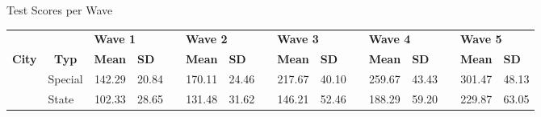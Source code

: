 \documentclass{beamer}
\begin{document}
\begin{frame}[label=ScoresWave]{Test Scores per Wave}
\vspace{-67pt} \flushright \hyperlink{Mirror}{\beamerbutton{\textcolor{red}{Mirror}}}
\vspace{30pt}
\begin{table}[H]
\label{table:AverageGrade}                        
  \begin{adjustbox}{width=1\textwidth}
    \begin{tabular}{llllllllllllllll}
    \toprule
          &       & \multicolumn{2}{p{6.055em}}{\textbf{\hspace{12pt} Wave 1 }} &       & \multicolumn{2}{p{6.055em}}{\textbf{\hspace{12pt} Wave 2 }} &       & \multicolumn{2}{p{6.055em}}{\textbf{\hspace{12pt} Wave 3 }} &       & \multicolumn{2}{p{6.055em}}{\textbf{\hspace{12pt} Wave 4 }} &       & \multicolumn{2}{p{6.055em}}{\textbf{\hspace{12pt} Wave 5 }} \\
\cmidrule{3-4}\cmidrule{6-7}\cmidrule{9-10}\cmidrule{12-13}\cmidrule{15-16}    \multicolumn{1}{c}{\textbf{City}} & \multicolumn{1}{c}{\textbf{Typ}} & \multicolumn{1}{p{3.445em}}{\textbf{ Mean }} & \multicolumn{1}{p{2.61em}}{\textbf{ SD }} &       & \multicolumn{1}{p{3.445em}}{\textbf{ Mean }} & \multicolumn{1}{p{2.61em}}{\textbf{ SD }} &       & \multicolumn{1}{p{3.445em}}{\textbf{ Mean }} & \multicolumn{1}{p{2.61em}}{\textbf{ SD }} &       & \multicolumn{1}{p{3.445em}}{\textbf{ Mean }} & \multicolumn{1}{p{2.61em}}{\textbf{ SD }} &       & \multicolumn{1}{p{3.445em}}{\textbf{ Mean }} & \multicolumn{1}{p{2.61em}}{\textbf{ SD }} \\
    \midrule
          & Special & \multicolumn{1}{c}{142.29} & \multicolumn{1}{c}{20.84} &       & \multicolumn{1}{c}{170.11} & \multicolumn{1}{c}{24.46} &       & \multicolumn{1}{c}{217.67} & \multicolumn{1}{c}{40.10} &       & \multicolumn{1}{c}{259.67} & \multicolumn{1}{c}{43.43} &       & \multicolumn{1}{c}{301.47} & \multicolumn{1}{c}{48.13} \\
          & State & \multicolumn{1}{c}{102.33} & \multicolumn{1}{c}{28.65} &       & \multicolumn{1}{c}{131.48} & \multicolumn{1}{c}{31.62} &       & \multicolumn{1}{c}{146.21} & \multicolumn{1}{c}{52.46} &       & \multicolumn{1}{c}{188.29} & \multicolumn{1}{c}{59.20} &       & \multicolumn{1}{c}{229.87} & \multicolumn{1}{c}{63.05} \\

\end{tabular}
\end{adjustbox}
\end{table}
\end{frame}
\end{document}

